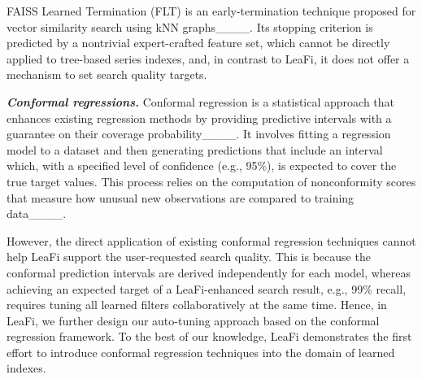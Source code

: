 FAISS Learned Termination (FLT) is an early-termination technique proposed for vector similarity search using kNN graphs____.
Its stopping criterion is predicted by a nontrivial expert-crafted feature set, which cannot be directly applied to tree-based series indexes, and, in contrast to LeaFi, it does not offer a mechanism to set search quality targets.



\noindent \textbf{\textit{Conformal regressions.}}
\label{sec-lit-conformal}
Conformal regression is a statistical approach that enhances existing regression methods by providing predictive intervals with a guarantee on their coverage probability____. 
It involves fitting a regression model to a dataset and then generating predictions that include an interval which, with a specified level of confidence (e.g., 95\%), is expected to cover the true target values. 
This process relies on the computation of nonconformity scores that measure how unusual new observations are compared to training data____.

However, the direct application of existing conformal regression techniques cannot help LeaFi support the user-requested search quality.
This is because the conformal prediction intervals are derived independently for each model, whereas achieving an expected target of a LeaFi-enhanced search result, e.g., 99\% recall, requires tuning all learned filters collaboratively at the same time.
Hence, in LeaFi, we further design our auto-tuning approach based on the conformal regression framework.
To the best of our knowledge, LeaFi demonstrates the first effort to introduce conformal regression techniques into the domain of learned indexes.